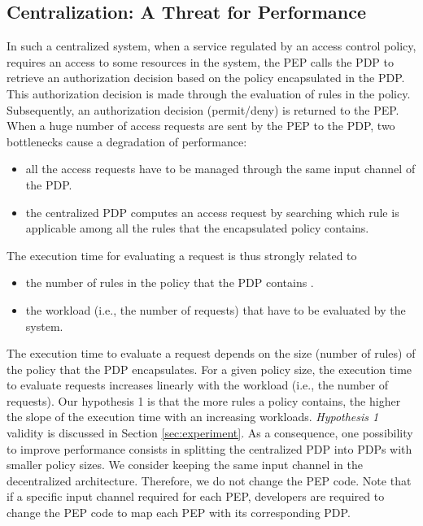 \subsection{Centralization: A Threat for Performance}
In such a centralized system, when a service regulated by an access control policy, requires an access to some resources in the system, the PEP calls the PDP to 
retrieve an authorization decision based on the policy encapsulated in the PDP. This authorization decision is made through the evaluation of rules in the policy. 
Subsequently, an authorization decision (permit/deny) is returned to the PEP. When a huge number of access requests are sent by the PEP to the PDP, two bottlenecks cause a degradation of performance:
\begin{itemize}
 \item all the access requests have to be managed through the same input channel of the PDP. 
 \item the centralized PDP computes an access request by searching which rule is applicable among all the rules that the encapsulated policy contains.
\end{itemize}
The execution time for evaluating a request is thus strongly related to
\begin{itemize} 
\item the number of rules in the policy that the PDP contains \cite{clustering}. 
\item the workload (i.e., the number of requests) that have to be evaluated by the system.
\end{itemize}
The execution time to evaluate a request depends on the size (number of rules) of the policy that the PDP encapsulates. For a given policy size, the execution time to evaluate
 requests increases linearly with the workload (i.e., the number of requests). Our hypothesis 1 is that the more rules a policy contains, the higher the slope of the execution time with an increasing workloads. 
 \textit{Hypothesis 1} validity is discussed in Section \ref{sec:experiment}.
As a consequence, one possibility to improve performance consists in splitting the centralized PDP into PDPs with smaller policy sizes.
We consider keeping the same input channel in the decentralized architecture. Therefore, we do not change the PEP code. 
Note that if a specific input channel required for each PEP, developers are required to change the PEP code to map each PEP with its corresponding PDP.  


